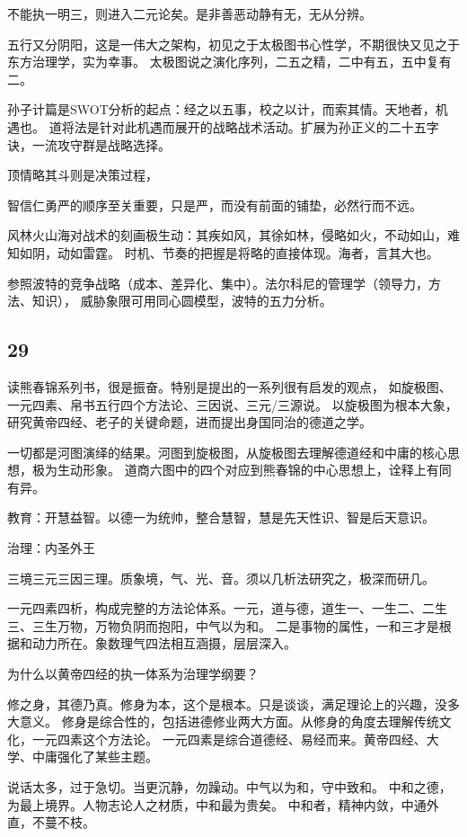 不能执一明三，则进入二元论矣。是非善恶动静有无，无从分辨。

五行又分阴阳，这是一伟大之架构，初见之于太极图书心性学，不期很快又见之于东方治理学，实为幸事。
太极图说之演化序列，二五之精，二中有五，五中复有二。

孙子计篇是SWOT分析的起点：经之以五事，校之以计，而索其情。天地者，机遇也。
道将法是针对此机遇而展开的战略战术活动。扩展为孙正义的二十五字诀，一流攻守群是战略选择。

顶情略其斗则是决策过程，

智信仁勇严的顺序至关重要，只是严，而没有前面的铺垫，必然行而不远。

风林火山海对战术的刻画极生动：其疾如风，其徐如林，侵略如火，不动如山，难知如阴，动如雷霆。
时机、节奏的把握是将略的直接体现。海者，言其大也。

参照波特的竞争战略（成本、差异化、集中）。法尔科尼的管理学（领导力，方法、知识），
威胁象限可用同心圆模型，波特的五力分析。

\subsection{29}

读熊春锦系列书，很是振奋。特别是提出的一系列很有启发的观点，
如旋极图、一元四素、帛书五行四个方法论、三因说、三元/三源说。
以旋极图为根本大象，研究黄帝四经、老子的关键命题，进而提出身国同治的德道之学。

一切都是河图演绎的结果。河图到旋极图，从旋极图去理解德道经和中庸的核心思想，极为生动形象。
道商六图中的四个对应到熊春锦的中心思想上，诠释上有同有异。

教育：开慧益智。以德一为统帅，整合慧智，慧是先天性识、智是后天意识。

治理：内圣外王

三境三元三因三理。质象境，气、光、音。须以几析法研究之，极深而研几。

一元四素四析，构成完整的方法论体系。一元，道与德，道生一、一生二、二生三、三生万物，万物负阴而抱阳，中气以为和。
二是事物的属性，一和三才是根据和动力所在。象数理气四法相互涵摄，层层深入。

为什么以黄帝四经的执一体系为治理学纲要？

修之身，其德乃真。修身为本，这个是根本。只是谈谈，满足理论上的兴趣，没多大意义。
修身是综合性的，包括进德修业两大方面。从修身的角度去理解传统文化，一元四素这个方法论。
一元四素是综合道德经、易经而来。黄帝四经、大学、中庸强化了某些主题。

说话太多，过于急切。当更沉静，勿躁动。中气以为和，守中致和。
中和之德，为最上境界。人物志论人之材质，中和最为贵矣。
中和者，精神内敛，中通外直，不蔓不枝。

